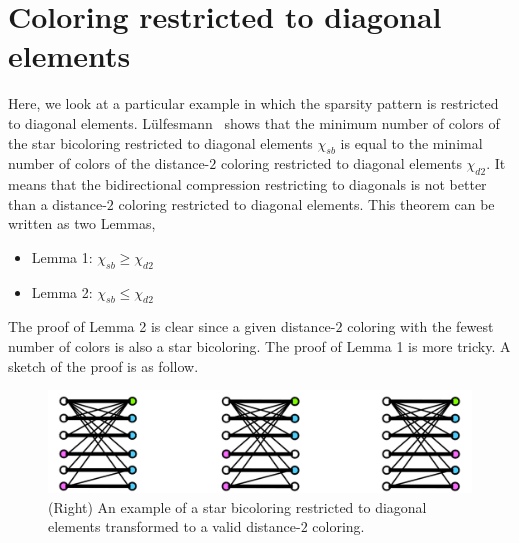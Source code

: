 \documentclass[12pt, twoside,a4paper,toc=bibliography]{scrbook}
\begin{document}
\clearpage
\section{Coloring restricted to diagonal elements}
\label{s.part.color.diag}
Here, we look at a particular example in which the sparsity pattern is restricted to diagonal elements.
Lülfesmann~\cite{Lulfesmann2012Fap} shows that the minimum number of colors of
the star bicoloring restricted to diagonal elements $\chi_{sb}$ is equal to
the minimal number of colors of the distance-$2$ coloring restricted
to diagonal elements $\chi_{d2}$.
It means that the bidirectional compression restricting to diagonals is not better than
a distance-$2$ coloring restricted to diagonal elements.
This theorem can be written as two Lemmas,
\begin{itemize}
\item Lemma 1: $\chi_{sb} \geq \chi_{d2}$
\item Lemma 2: $\chi_{sb} \leq \chi_{d2}$
\end{itemize}
The proof of Lemma 2 is clear since
a given distance-$2$ coloring with the fewest number of colors is also a star bicoloring.
The proof of Lemma 1 is more tricky. A sketch of the proof is as follow.
\begin{figure}
\includegraphics[width=\linewidth]{proof1.png}
\caption{
(Right) An example of a star bicoloring restricted to diagonal elements
transformed to a valid distance-$2$ coloring.}
\label{proof1}
\end{figure}
\end{document}
